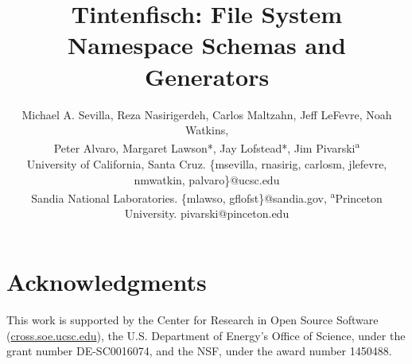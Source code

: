 \documentclass[letterpaper,twocolumn,10pt]{article}
\begin{document}
\date{}

\title{Tintenfisch: File System Namespace Schemas and Generators\vspace{-1em}}

\author{
{\rm Michael A. Sevilla, Reza Nasirigerdeh, Carlos Maltzahn, Jeff LeFevre, Noah Watkins,}\\
{\rm Peter Alvaro, Margaret Lawson*, Jay Lofstead*, Jim Pivarski\textsuperscript{a}}\\
{\small University of California, Santa Cruz. \{msevilla, rnasirig, carlosm, jlefevre, nmwatkin, palvaro\}@ucsc.edu}\\
{\small *Sandia National Laboratories. \{mlawso, gflofst\}@sandia.gov, \textsuperscript{a}Princeton University. pivarski@pinceton.edu}
} %

\maketitle

\thispagestyle{empty}



%





\section*{Acknowledgments}

This work is supported by the Center for Research in Open Source Software
(\href{https://cross.soe.ucsc.edu}{cross.soe.ucsc.edu}), the U.S.  Department
of Energy's Office of Science, under the grant number DE-SC0016074, and the
NSF, under the award number 1450488.

{\footnotesize 
}
\end{document}
